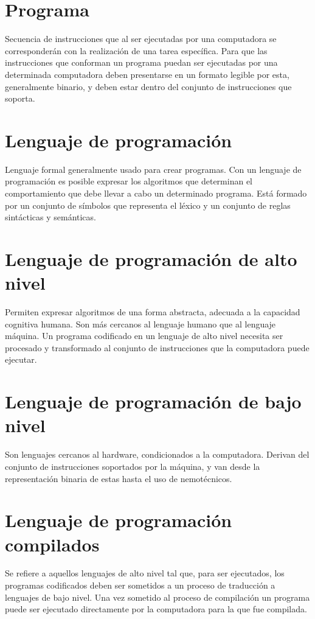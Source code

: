 \section{Programa}
Secuencia de instrucciones que al ser ejecutadas por una computadora se corresponderán con
la realización de una tarea específica. Para que las instrucciones que conforman un programa puedan ser ejecutadas 
por una determinada computadora deben presentarse en un formato legible por esta, generalmente binario, y deben estar dentro
del conjunto de instrucciones que soporta. 

\section{Lenguaje de programación}
Lenguaje formal generalmente usado para crear programas. Con un lenguaje de programación es posible expresar los 
algoritmos que determinan el comportamiento que debe llevar a cabo un determinado programa. Está formado por
un conjunto de símbolos que representa el léxico y un conjunto de reglas sintácticas y semánticas. 

\section{Lenguaje de programación de alto nivel}
Permiten expresar algoritmos de una forma abstracta, adecuada a la capacidad cognitiva humana. Son más cercanos
al lenguaje humano que al lenguaje máquina. Un programa codificado en un lenguaje de alto nivel necesita ser procesado 
y transformado al conjunto de instrucciones que la computadora puede ejecutar. 

\section{Lenguaje de programación de bajo nivel}
Son lenguajes cercanos al hardware, condicionados a la computadora. Derivan del conjunto de instrucciones 
soportados por la máquina, y van desde la representación binaria de estas hasta el uso de nemotécnicos.

\section{Lenguaje de programación compilados}
Se refiere a aquellos lenguajes de alto nivel tal que, para ser ejecutados, los programas codificados deben ser sometidos a un proceso 
de traducción a lenguajes de bajo nivel. Una vez sometido al proceso de compilación un programa puede ser ejecutado directamente por 
la computadora para la que fue compilada.  

